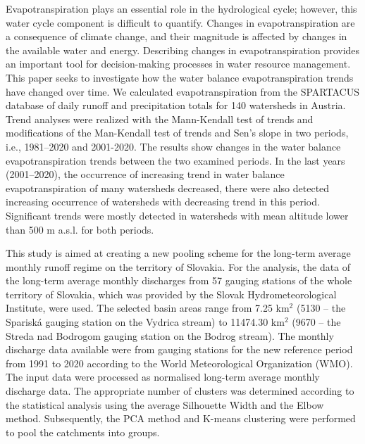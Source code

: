 Evapotranspiration plays an essential role in the hydrological cycle; however, this water cycle component is difficult to quantify. Changes in evapotranspiration are a consequence of climate change, and their magnitude is affected by changes in the available water and energy. Describing changes in evapotranspiration provides an important tool for decision-making processes in water resource management. This paper seeks to investigate how the water balance evapotranspiration trends have changed over time. We calculated evapotranspiration from the SPARTACUS database of daily runoff and precipitation totals for 140 watersheds in Austria. Trend analyses were realized with the Mann-Kendall test of trends and modifications of the Man-Kendall test of trends and Sen’s slope in two periods, i.e., 1981–2020 and 2001-2020. The results show changes in the water balance evapotranspiration trends between the two examined periods. In the last years (2001–2020), the occurrence of increasing trend in water balance evapotranspiration of many watersheds decreased, there were also detected increasing occurrence of watersheds with decreasing trend in this period. Significant trends were mostly detected in watersheds with mean altitude lower than 500 m a.s.l. for both periods. 
\newpage{}
{}
\begin{flushleft}





\end{flushleft}

\noindent

This study is aimed at creating a new pooling scheme for the long-term average monthly runoff regime on the territory of Slovakia. For the analysis, the data of the long-term average monthly discharges from 57 gauging stations of the whole territory of Slovakia, which was provided by the Slovak Hydrometeorological Institute, were used. The selected basin areas range from 7.25 km$^2$ (5130 – the Spariská gauging station on the Vydrica stream) to 11474.30 km$^2$ (9670 – the Streda nad Bodrogom gauging station on the Bodrog stream). The monthly discharge data available were from gauging stations for the new reference period from 1991 to 2020 according to the World Meteorological Organization (WMO). The input data were processed as normalised long-term average monthly discharge data. The appropriate number of clusters was determined according to the statistical analysis using the average Silhouette Width and the Elbow method. Subsequently, the PCA method and K-means clustering were performed to pool the catchments into groups.


